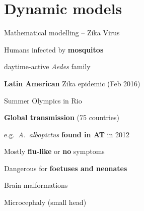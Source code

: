\documentclass[table,notes]{beamer}\usepackage[]{graphicx}\usepackage[]{color}
\begin{document}
\section{Dynamic models}
\begin{frame}[fragile]{Mathematical modelling -- Zika Virus} %

\begin{minipage}{.6\textwidth}
Humans infected by \textbf{mosquitos} \par
\hspace*{0.5cm} daytime-active \textit{Aedes} family \par
\vspace{0.3cm}
\textbf{Latin American} Zika epidemic (Feb 2016) \par
\vspace{0.1cm}
\hspace*{0.5cm} Summer Olympics in Rio \par %
\vspace{0.1cm}
\hspace*{0.5cm} \textbf{Global transmission} (75 countries) \par
\vspace{0.1cm}
\hspace*{0.5cm} e.g.\ \textit{A.\ albopictus} \textbf{found in AT} in 2012 \par
\vspace{0.3cm} 
Mostly \textbf{flu-like} or \textbf{no} symptoms \par
\vspace{0.3cm} 
Dangerous for \textbf{foetuses and neonates} \par
\vspace{0.1cm}
\hspace*{0.5cm} Brain malformations \par
\vspace{0.1cm}
\hspace*{0.5cm} Microcephaly (small head)


\end{minipage}
\end{frame}
\end{document}
